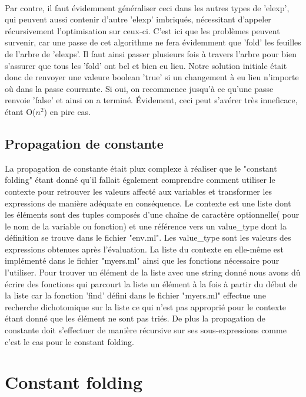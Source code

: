 \documentclass{article}
\begin{document}
\paragraph{}
Par contre, il faut évidemment généraliser ceci dans les autres types de 'elexp', qui peuvent aussi contenir d'autre 'elexp' imbriqués, nécessitant d'appeler récursivement l'optimisation sur ceux-ci. C'est ici que les problèmes peuvent survenir, car une passe de cet algorithme ne fera évidemment que 'fold' les feuilles de l'arbre de 'elexps'. Il faut ainsi passer plusieurs fois à travers l'arbre pour bien s'assurer que tous les 'fold' ont bel et bien eu lieu. Notre solution initiale était donc de renvoyer une valeure boolean 'true' si un changement à eu lieu n'importe où dans la passe courrante. Si oui, on recommence jusqu'à ce qu'une passe renvoie 'false' et ainsi on a terminé. Évidement, ceci peut s'avérer très inneficace, étant O($n^2$) en pire cas.


\subsection{Propagation de constante}

La propagation de constante était plux complexe à réaliser que le "constant
folding" étant donné qu'il fallait également comprendre comment utiliser le 
contexte pour retrouver les valeurs affecté aux variables et transformer les
expressions de manière adéquate en conséquence. Le contexte est une liste dont
les éléments sont des tuples composés d'une chaîne de caractère optionnelle(
pour le nom de la variable ou fonction) et une référence vers un value\_type
dont la définition se trouve dans le fichier "env.ml". Les value\_type sont
les valeurs des expressions obtenues après l'évaluation. La liste du contexte
en elle-même est implémenté dans le fichier "myers.ml" ainsi que les fonctions
nécessaire pour l'utiliser. Pour trouver un élément de la liste avec une
string donné nous avons dû écrire des fonctions qui parcourt la liste un 
élément à la fois à partir du début de la liste car la fonction 'find' défini
dans le fichier "myers.ml" effectue une recherche dichotomique sur la liste ce
qui n'est pas approprié pour le contexte étant donné que les élément ne sont
pas triés. De plus la propagation de constante doit s'effectuer de manière 
récursive sur ses sous-expressions comme c'est le cas pour le constant folding.

\section{Constant folding}
\end{document}
